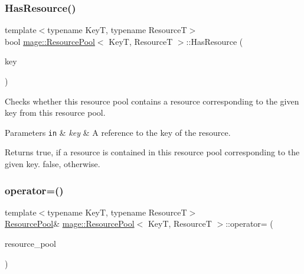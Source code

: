 \subsubsection{\texorpdfstring{Has\+Resource()}{HasResource()}}
{\footnotesize\ttfamily template$<$typename KeyT, typename ResourceT$>$ \\
bool \hyperlink{classmage_1_1_resource_pool}{mage\+::\+Resource\+Pool}$<$ KeyT, ResourceT $>$\+::Has\+Resource (\begin{DoxyParamCaption}\item[{const KeyT \&}]{key }\end{DoxyParamCaption})\hspace{0.3cm}{\ttfamily [noexcept]}}

Checks whether this resource pool contains a resource corresponding to the given key from this resource pool.


\begin{DoxyParams}[1]{Parameters}
\mbox{\tt in}  & {\em key} & A reference to the key of the resource. \\
\hline
\end{DoxyParams}
\begin{DoxyReturn}{Returns}
{\ttfamily true}, if a resource is contained in this resource pool corresponding to the given key. {\ttfamily false}, otherwise. 
\end{DoxyReturn}
\hypertarget{classmage_1_1_resource_pool_ae8121e031efe9f98605e478b01b19d33}{}\label{classmage_1_1_resource_pool_ae8121e031efe9f98605e478b01b19d33} 
\subsubsection{\texorpdfstring{operator=()}{operator=()}\hspace{0.1cm}{\footnotesize\ttfamily [1/2]}}
{\footnotesize\ttfamily template$<$typename KeyT, typename ResourceT$>$ \\
\hyperlink{classmage_1_1_resource_pool}{Resource\+Pool}\& \hyperlink{classmage_1_1_resource_pool}{mage\+::\+Resource\+Pool}$<$ KeyT, ResourceT $>$\+::operator= (\begin{DoxyParamCaption}\item[{const \hyperlink{classmage_1_1_resource_pool}{Resource\+Pool}$<$ KeyT, ResourceT $>$ \&}]{resource\+\_\+pool }\end{DoxyParamCaption})\hspace{0.3cm}{\ttfamily [delete]}}

